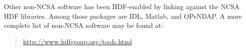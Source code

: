 Other non-NCSA software has been HDF-enabled by linking against the
NCSA HDF libraries.  Among those packages are IDL, Matlab, and
OPeNDAP.  A more complete list of non-NCSA software may be found at:
\begin{quote}
  \url{http://www.hdfgroup.org/tools.html}
\end{quote}



